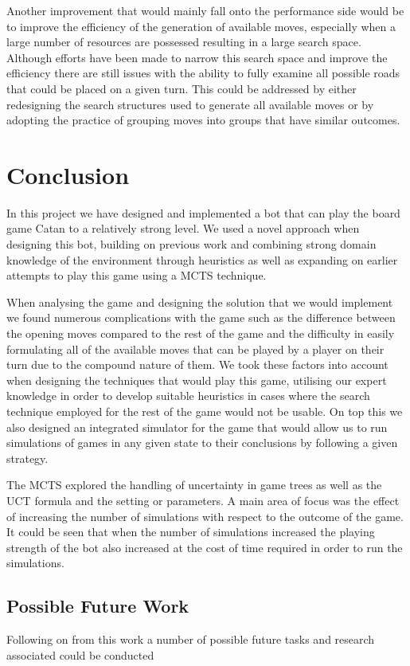 \documentclass[]{article}
\let\oldsection\section
\renewcommand\section{\clearpage\oldsection}
\begin{document}
\par Another improvement that would mainly fall onto the performance side would be to improve the efficiency of the generation of available moves, especially when a large number of resources are possessed resulting in a large search space. Although efforts have been made to narrow this search space and improve the efficiency there are still issues with the ability to fully examine all possible roads that could be placed on a given turn. This could be addressed by either redesigning the search structures used to generate all available moves or by adopting the practice of grouping moves into groups that have similar outcomes.

\section{Conclusion}
In this project we have designed and implemented a bot that can play the board game Catan to a relatively strong level. We used a novel approach when designing this bot, building on previous work and combining strong domain knowledge of the environment through heuristics as well as expanding on earlier attempts to play this game using a MCTS technique.

When analysing the game and designing the solution that we would implement we found numerous complications with the game such as the difference between the opening moves compared to the rest of the game and the difficulty in easily formulating all of the available moves that can be played by a player on their turn due to the compound nature of them. We took these factors into account when designing the techniques that would play this game, utilising our expert knowledge in order to develop suitable heuristics in cases where the search technique employed for the rest of the game would not be usable. On top this we also designed an integrated simulator for the game that would allow us to run simulations of games in any given state to their conclusions by following a given strategy.

The MCTS explored the handling of uncertainty in game trees as well as the UCT formula and the setting or parameters. A main area of focus was the effect of increasing the number of simulations with respect to the outcome of the game. It could be seen that when the number of simulations increased the playing strength of the bot also increased at the cost of time required in order to run the simulations.

\subsection{Possible Future Work}
Following on from this work a number of possible future tasks and research associated could be conducted
\end{document}
